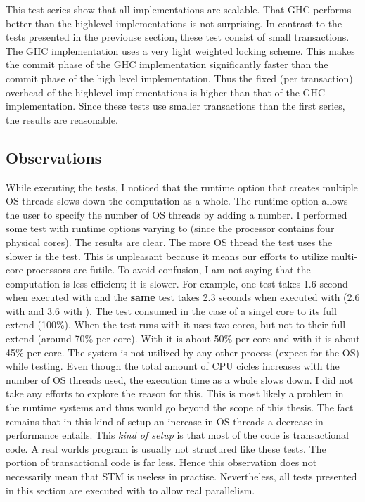 This test series show that all implementations are scalable. That GHC performs better than the highlevel implementations
is not surprising. In contrast to the tests presented in the previouse section, these test consist of small transactions.
The GHC implementation uses a very light weighted locking scheme. This makes the commit phase of the GHC implementation
significantly faster than the commit phase of the high level implementation. Thus the fixed (per transaction) overhead
of the highlevel implementations is higher than that of the GHC implementation. Since these tests use smaller transactions
than the first series, the results are reasonable.

\subsection{Observations}
While executing the tests, I noticed that the runtime option  that creates multiple OS threads slows down the 
computation as a whole. The runtime option  allows the user to specify the number of OS threads by adding a 
number. I performed some test with runtime options varying  to  (since the processor contains four 
physical cores). The results are clear. The more OS thread the test uses the slower is the test. This is unpleasant 
because it means our efforts to utilize multi-core processors are futile. To avoid confusion, I am not saying that 
the computation is less efficient; it is slower. For example, one test takes 1.6 second when executed with 
and the \textbf{same} test takes 2.3 seconds when executed with  (2.6 with  and 3.6 with ).
The test consumed in the case of  a singel core to its full extend (100\%). When the test runs with 
it uses two cores, but not to their full extend (around 70\% per core). With  it is about 50\% per core and 
with  it is about 45\% per core. The system is not utilized by any other process (expect for the OS) while
testing. Even though the total amount of CPU cicles increases with the number of OS threads used, the execution time 
as a whole slows down. I did not take any efforts to explore the reason for this. This is most likely a problem 
in the runtime systems and thus would go beyond the scope of this thesis. The fact remains that in this kind of
setup an increase in OS threads a decrease in performance entails. This \textit{kind of setup} is that most of 
the code is transactional code. A real worlds program is usually not structured like these tests. The portion
of transactional code is far less. Hence this observation does not necessarily mean that STM is useless in 
practise. Nevertheless, all tests presented in this section are executed with  to allow real parallelism. 

